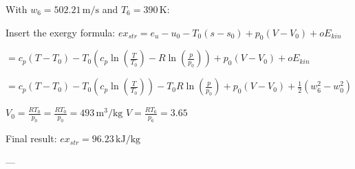 With \( w_6 = 502.21 \, \text{m/s} \) and \( T_6 = 390 \, \text{K} \):  

Insert the exergy formula:  
\( ex_{str} = e_{u} - u_{0} - T_{0}(s - s_{0}) + p_{0}(V - V_{0}) + oE_{kin} \)  

\( = c_{p}(T - T_{0}) - T_{0}(c_{p} \ln(\frac{T}{T_{0}}) - R \ln(\frac{p}{p_{0}})) + p_{0}(V - V_{0}) + oE_{kin} \)  

\( = c_{p}(T - T_{0}) - T_{0}(c_{p} \ln(\frac{T}{T_{0}})) - T_{0}R \ln(\frac{p}{p_{0}}) + p_{0}(V - V_{0}) + \frac{1}{2}(w_{6}^2 - w_{0}^2) \)  

\( V_{0} = \frac{RT_{0}}{p_{0}} = \frac{RT_{0}}{p_{0}} = 493 \, \text{m}^3/\text{kg} \)  
\( V = \frac{RT_{6}}{p_{6}} = 3.65 \)  

Final result:  
\( ex_{str} = 96.23 \, \text{kJ}/\text{kg} \)  

---
